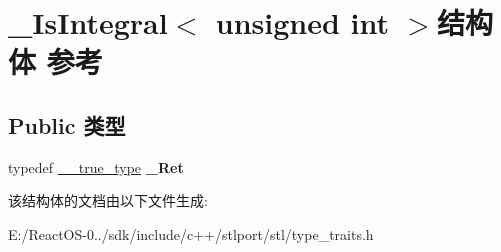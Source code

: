 \hypertarget{struct___is_integral_3_01unsigned_01int_01_4}{}\section{\+\_\+\+Is\+Integral$<$ unsigned int $>$结构体 参考}
\label{struct___is_integral_3_01unsigned_01int_01_4}
\subsection*{Public 类型}
\begin{DoxyCompactItemize}
\item 
\mbox{\label{struct___is_integral_3_01unsigned_01int_01_4_a504348e35d9048b67654781b9ffba9ca}} 
typedef \hyperlink{struct____true__type}{\+\_\+\+\_\+true\+\_\+type} {\bfseries \+\_\+\+Ret}
\end{DoxyCompactItemize}


该结构体的文档由以下文件生成\+:\begin{DoxyCompactItemize}
\item 
E\+:/\+React\+O\+S-\/0../sdk/include/c++/stlport/stl/type\+\_\+traits.\+h\end{DoxyCompactItemize}
